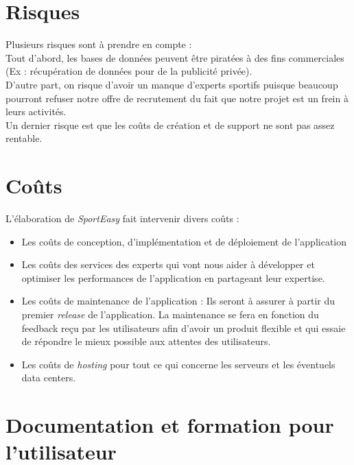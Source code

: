 \section{Risques}

Plusieurs risques sont à prendre en compte : \\

Tout d'abord, les bases de données peuvent être piratées à des fins commerciales (Ex : récupération de données pour de la publicité privée).\\

D'autre part, on risque d'avoir un manque d'experts sportifs puisque beaucoup pourront refuser notre offre de recrutement du fait que notre projet est un frein à leurs activités.\\

Un dernier risque est que les coûts de création et de support ne sont pas assez rentable.

\section{Coûts}

L'élaboration de \textit{SportEasy} fait intervenir divers coûts :

\begin{itemize}

\item Les coûts de conception, d'implémentation et de déploiement de l'application

\item Les coûts des services des experts qui vont nous aider à développer et optimiser les performances de l'application en partageant leur expertise.

\item Les coûts de maintenance de l'application : Ils seront à assurer à partir du premier \textit{release} de l'application. La maintenance se fera en fonction du feedback reçu par les utilisateurs afin d'avoir un produit flexible et qui essaie de répondre le mieux possible aux attentes des utilisateurs.

\item Les coûts de \textit{hosting} pour tout ce qui concerne les serveurs et les éventuels data centers.

\end{itemize}

\section{Documentation et formation pour l'utilisateur}

